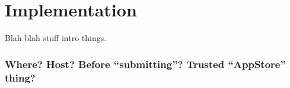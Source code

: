 \chapter {Implementation}

Blah blah stuff intro things.

\subsection {Where? Host? Before ``submitting''? Trusted ``AppStore'' thing?}
